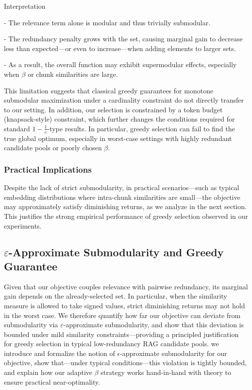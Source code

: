 \documentclass[11pt]{article}
\begin{document}
Interpretation

- The relevance term alone is modular and thus trivially submodular.
    
- The redundancy penalty grows with the set, causing marginal gain to decrease less than expected—or even to increase—when adding elements to larger sets.
    
- As a result, the overall function may exhibit supermodular effects, especially when $\beta$ or chunk similarities are large.
    

This limitation suggests that classical greedy guarantees for monotone submodular maximization under a cardinality constraint do not directly transfer to our setting. In addition, our selection is constrained by a token budget (knapsack-style) constraint, which further changes the conditions required for standard $1-\frac{1}{e}$-type results. In particular, greedy selection can fail to find the true global optimum, especially in worst-case settings with highly redundant candidate pools or poorly chosen $\beta$.

\subsubsection{Practical Implications}


Despite the lack of strict submodularity, in practical scenarios—such as typical embedding distributions where intra-chunk similarities are small—the objective may approximately satisfy diminishing returns, as we analyze in the next section. This justifies the strong empirical performance of greedy selection observed in our experiments.

\subsection{$\varepsilon$-Approximate Submodularity and Greedy Guarantee}

Given that our objective couples relevance with pairwise redundancy, its marginal gain depends on the already-selected set. In particular, when the similarity measure is allowed to take signed values, strict diminishing returns may not hold in the worst case. We therefore quantify how far our objective can deviate from submodularity via $\varepsilon$-approximate submodularity, and show that this deviation is bounded under mild similarity constraints—providing a principled justification for greedy selection in typical low-redundancy RAG candidate pools. we introduce and formalize the notion of $\epsilon$-approximate submodularity for our objective, show that—under typical conditions—this violation is tightly bounded, and explain how our adaptive $\beta$ strategy works hand-in-hand with theory to ensure practical near-optimality.
\end{document}
